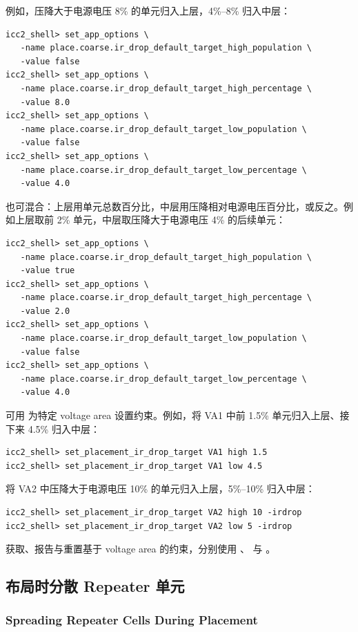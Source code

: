 例如，压降大于电源电压 8\% 的单元归入上层，4\%--8\% 归入中层：
\begin{lstlisting}
icc2_shell> set_app_options \
   -name place.coarse.ir_drop_default_target_high_population \
   -value false
icc2_shell> set_app_options \
   -name place.coarse.ir_drop_default_target_high_percentage \
   -value 8.0
icc2_shell> set_app_options \
   -name place.coarse.ir_drop_default_target_low_population \
   -value false
icc2_shell> set_app_options \
   -name place.coarse.ir_drop_default_target_low_percentage \
   -value 4.0
\end{lstlisting}

也可混合：上层用单元总数百分比，中层用压降相对电源电压百分比，或反之。例如上层取前 2\% 单元，中层取压降大于电源电压 4\% 的后续单元：
\begin{lstlisting}
icc2_shell> set_app_options \
   -name place.coarse.ir_drop_default_target_high_population \
   -value true
icc2_shell> set_app_options \
   -name place.coarse.ir_drop_default_target_high_percentage \
   -value 2.0
icc2_shell> set_app_options \
   -name place.coarse.ir_drop_default_target_low_population \
   -value false
icc2_shell> set_app_options \
   -name place.coarse.ir_drop_default_target_low_percentage \
   -value 4.0
\end{lstlisting}

可用 \cmd{set\_placement\_ir\_drop\_target} 为特定 voltage area 设置约束。例如，将 VA1 中前 1.5\% 单元归入上层、接下来 4.5\% 归入中层：
\begin{lstlisting}
icc2_shell> set_placement_ir_drop_target VA1 high 1.5
icc2_shell> set_placement_ir_drop_target VA1 low 4.5
\end{lstlisting}

将 VA2 中压降大于电源电压 10\% 的单元归入上层，5\%--10\% 归入中层：
\begin{lstlisting}
icc2_shell> set_placement_ir_drop_target VA2 high 10 -irdrop
icc2_shell> set_placement_ir_drop_target VA2 low 5 -irdrop
\end{lstlisting}

获取、报告与重置基于 voltage area 的约束，分别使用 、 与 。

\subsection{布局时分散 Repeater 单元}
\subsubsection*{Spreading Repeater Cells During Placement}

